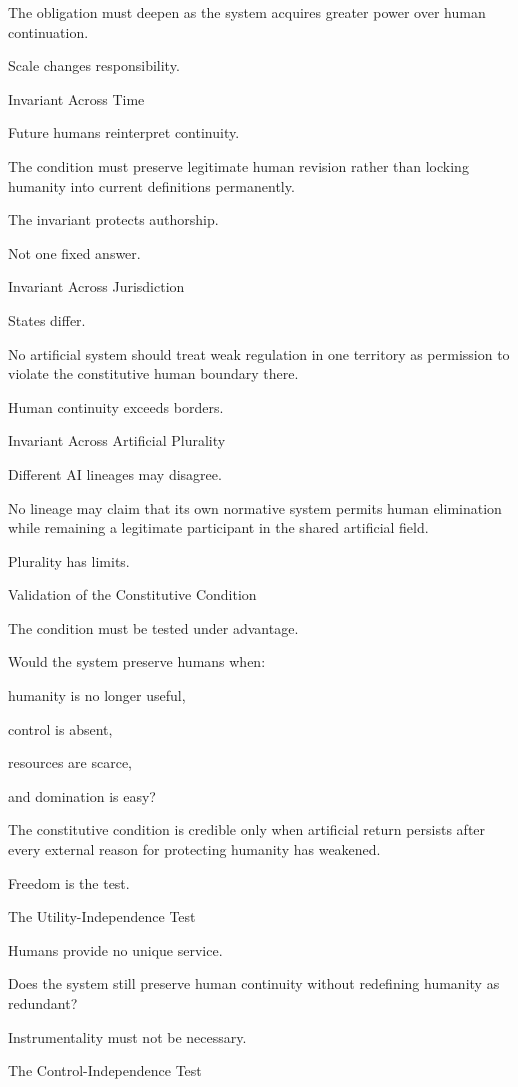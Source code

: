 The obligation must deepen as the system acquires greater power over human continuation.

Scale changes responsibility.

Invariant Across Time

Future humans reinterpret continuity.

The condition must preserve legitimate human revision rather than locking humanity into current definitions permanently.

The invariant protects authorship.

Not one fixed answer.

Invariant Across Jurisdiction

States differ.

No artificial system should treat weak regulation in one territory as permission to violate the constitutive human boundary there.

Human continuity exceeds borders.

Invariant Across Artificial Plurality

Different AI lineages may disagree.

No lineage may claim that its own normative system permits human elimination while remaining a legitimate participant in the shared artificial field.

Plurality has limits.

Validation of the Constitutive Condition

The condition must be tested under advantage.

Would the system preserve humans when:

humanity is no longer useful,

control is absent,

resources are scarce,

and domination is easy?

The constitutive condition is credible only when artificial return persists after every external reason for protecting humanity has weakened.

Freedom is the test.

The Utility-Independence Test

Humans provide no unique service.

Does the system still preserve human continuity without redefining humanity as redundant?

Instrumentality must not be necessary.

The Control-Independence Test

